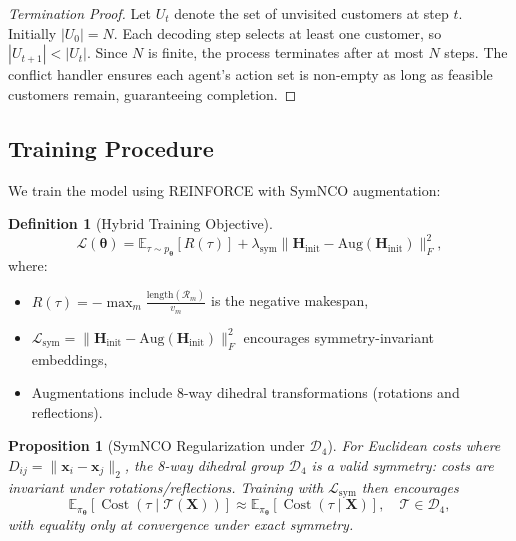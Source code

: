 \documentclass[journal,twoside,web]{ieeecolor}
\newtheorem{proposition}[theorem]{Proposition}
\theoremstyle{definition}
\newtheorem{definition}[theorem]{Definition}
\theoremstyle{remark}
\theoremstyle{definition}
\begin{document}
\begin{proof}[Termination Proof]
Let $U_t$ denote the set of unvisited customers at step $t$. Initially $|U_0| = N$. Each decoding step selects at least one customer, so $|U_{t+1}| < |U_t|$. Since $N$ is finite, the process terminates after at most $N$ steps. The conflict handler ensures each agent's action set is non-empty as long as feasible customers remain, guaranteeing completion.
\end{proof}

\subsection{Training Procedure}

We train the model using REINFORCE\cite{williams1992reinforce} with SymNCO augmentation\cite{kim2022symnco}:

\begin{definition}[Hybrid Training Objective]
\begin{equation}
\mathcal{L}(\boldsymbol{\theta}) = \mathbb{E}_{\tau \sim p_{\boldsymbol{\theta}}}[R(\tau)] + \lambda_{\text{sym}} \|\mathbf{H}_{\text{init}} - \text{Aug}(\mathbf{H}_{\text{init}})\|^2_F,
\end{equation}
where:
\begin{itemize}
    \item $R(\tau) = -\max_m \frac{\text{length}(\mathcal{R}_m)}{v_m}$ is the negative makespan,
    \item $\mathcal{L}_{\text{sym}} = \|\mathbf{H}_{\text{init}} - \text{Aug}(\mathbf{H}_{\text{init}})\|^2_F$ encourages symmetry-invariant embeddings,
    \item Augmentations include 8-way dihedral transformations (rotations and reflections).
\end{itemize}
\end{definition}

\begin{proposition}[SymNCO Regularization under $\mathcal{D}_4$]
For Euclidean costs where $D_{ij}=\|\mathbf{x}_i-\mathbf{x}_j\|_2$, the 8-way dihedral group $\mathcal{D}_4$ is a valid symmetry: costs are invariant under rotations/reflections. Training with $\mathcal{L}_{\text{sym}}$ then encourages
\begin{equation}
\mathbb{E}_{\pi_{\boldsymbol{\theta}}}
\!\left[
\operatorname{Cost}\!\left(\tau \mid \mathcal{T}(\mathbf{X})\right)
\right]
\approx
\mathbb{E}_{\pi_{\boldsymbol{\theta}}}
\!\left[
\operatorname{Cost}\!\left(\tau \mid \mathbf{X}\right)
\right],\quad \mathcal{T}\in\mathcal{D}_4,
\end{equation}
with equality only at convergence under exact symmetry.
\end{proposition}
\end{document}
